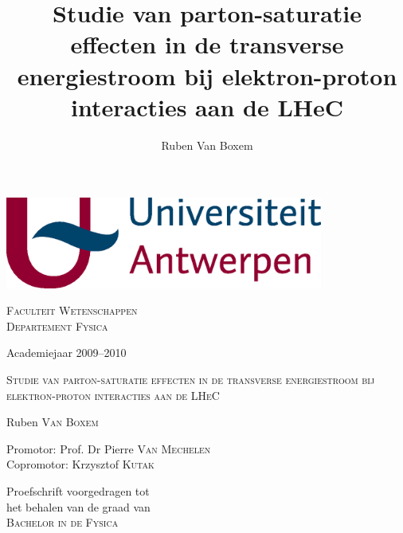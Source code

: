 \documentclass[a4paper,11pt]{article}
\title{Studie van parton-saturatie effecten in de transverse energiestroom bij elektron-proton interacties aan de LHeC}
\author{Ruben Van Boxem}
\numberwithin{equation}{section} %
\begin{document}
\fontsize{12pt}{14pt}\selectfont

\begin{center}

\includegraphics[height=3cm]{Afbeeldingen/UA.eps}

\vspace{1cm}

\fontsize{14pt}{17pt}\selectfont
\textsc{Faculteit Wetenschappen} \\
\textsc{Departement Fysica}
\fontsize{12pt}{14pt}\selectfont
\vspace{0.3cm}

\vspace{1.2cm}

Academiejaar 2009--2010

\vspace{2.8cm}

\fontsize{17.28pt}{21pt}\selectfont

\textsc{Studie van parton-saturatie effecten in de transverse energiestroom bij elektron-proton interacties aan de LHeC}

\fontsize{12pt}{14pt}\selectfont

\vspace{3cm}

Ruben \textsc{Van Boxem}	

\vspace{2cm}

Promotor: Prof. Dr Pierre \textsc{Van Mechelen}\\
Copromotor: Krzysztof \textsc{Kutak} \\
\vspace{2cm}
\end{center}
Proefschrift voorgedragen tot \\
het behalen van de graad van\\
\textsc{Bachelor in de Fysica}

\thispagestyle{empty}
\newpage
\end{document}
